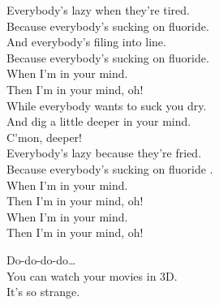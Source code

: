
\label{album:im-in-your-mind-fuzz}





Everybody's lazy when they're tired. \\
Because everybody's sucking on fluoride. \\
And everybody's filing into line. \\
Because everybody's sucking on fluoride. \\

When I'm in your mind. \\
Then I'm in your mind, oh! \\

While everybody wants to suck you dry. \\
And dig a little deeper in your mind. \\
C'mon, deeper! \\
Everybody's lazy because they're fried. \\
Because everybody's sucking on fluoride . \\

When I'm in your mind. \\
Then I'm in your mind, oh! \\
When I'm in your mind. \\
Then I'm in your mind, oh! \\









Do-do-do-do… \\

You can watch your movies in 3D. \\
It's so strange. \\

